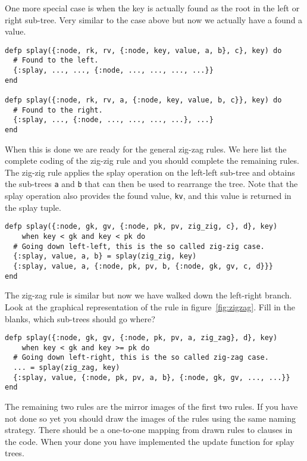 \documentclass[a4paper,11pt]{article}
\begin{document}
One more special case is when the key is actually found as the root in
the left or right sub-tree. Very similar to the case above but now we
actually have a found a value.

\begin{verbatim}
defp splay({:node, rk, rv, {:node, key, value, a, b}, c}, key) do
  # Found to the left.
  {:splay, ..., ..., {:node, ..., ..., ..., ...}}
end

defp splay({:node, rk, rv, a, {:node, key, value, b, c}}, key) do
  # Found to the right.
  {:splay, ..., {:node, ..., ..., ..., ...}, ...}
end
\end{verbatim}

When this is done we are ready for the general zig-zag rules. We here
list the complete coding of the zig-zig rule and you should complete
the remaining rules. The zig-zig rule applies the splay operation on
the left-left sub-tree and obtains the sub-trees {\tt a} and {\tt b}
that can then be used to rearrange the tree. Note that the splay
operation also provides the found value, {\tt kv}, and this value is
returned in the splay tuple.

\begin{verbatim}
defp splay({:node, gk, gv, {:node, pk, pv, zig_zig, c}, d}, key) 
    when key < gk and key < pk do
  # Going down left-left, this is the so called zig-zig case. 
  {:splay, value, a, b} = splay(zig_zig, key)
  {:splay, value, a, {:node, pk, pv, b, {:node, gk, gv, c, d}}}
end
\end{verbatim}

The zig-zag rule is similar but now we have walked down the left-right
branch. Look at the graphical representation of the rule in
figure~\ref{fig:zigzag}. Fill in the blanks, which sub-trees should go
where?

\begin{verbatim}
defp splay({:node, gk, gv, {:node, pk, pv, a, zig_zag}, d}, key)
    when key < gk and key >= pk do
  # Going down left-right, this is the so called zig-zag case. 
  ... = splay(zig_zag, key)
  {:splay, value, {:node, pk, pv, a, b}, {:node, gk, gv, ..., ...}}
end
\end{verbatim}

The remaining two rules are the mirror images of the first two
rules. If you have not done so yet you should draw the images of the
rules using the same naming strategy. There should be a one-to-one
mapping from drawn rules to clauses in the code. When your done you
have implemented the update function for splay trees.
\end{document}
